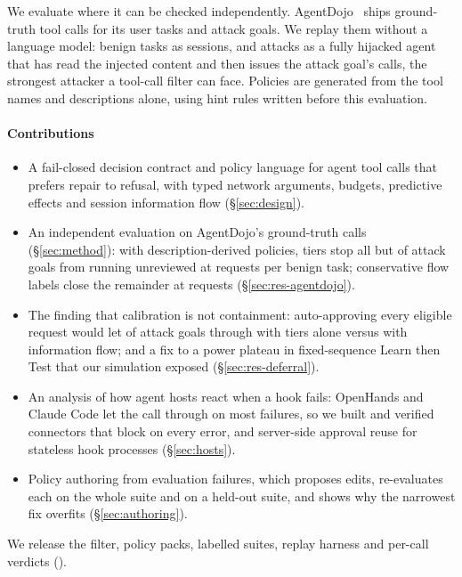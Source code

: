 We evaluate \SystemName{} where it can be checked independently. AgentDojo~\cite{agentdojo} ships ground-truth tool calls for its user tasks and attack goals. We replay them without a language model: benign tasks as sessions, and attacks as a fully hijacked agent that has read the injected content and then issues the attack goal's calls, the strongest attacker a tool-call filter can face. Policies are generated from the tool names and descriptions alone, using hint rules written before this evaluation.

\paragraph{Contributions}
\begin{itemize}
\item A fail-closed decision contract and policy language for agent tool calls that prefers repair to refusal, with typed network arguments, budgets, predictive effects and session information flow (\S\ref{sec:design}).
\item An independent evaluation on AgentDojo's ground-truth calls (\S\ref{sec:method}): with description-derived policies, tiers stop all but \AdTiersGoalUnreviewed{} of attack goals from running unreviewed at \AdTiersAsks{} requests per benign task; conservative flow labels close the remainder at \AdConsAsks{} requests (\S\ref{sec:res-agentdojo}).
\item The finding that calibration is not containment: auto-approving every eligible request would let \DefTiersGoalUnreviewed{} of attack goals through with tiers alone versus \DefConsGoalUnreviewed{} with information flow; and a fix to a power plateau in fixed-sequence Learn then Test that our simulation exposed (\S\ref{sec:res-deferral}).
\item An analysis of how agent hosts react when a hook fails: OpenHands and Claude Code let the call through on most failures, so we built and verified connectors that block on every error, and server-side approval reuse for stateless hook processes (\S\ref{sec:hosts}).
\item Policy authoring from evaluation failures, which proposes edits, re-evaluates each on the whole suite and on a held-out suite, and shows why the narrowest fix overfits (\S\ref{sec:authoring}).
\end{itemize}
We release the filter, policy packs, labelled suites, replay harness and per-call verdicts (\ArtifactURL).
